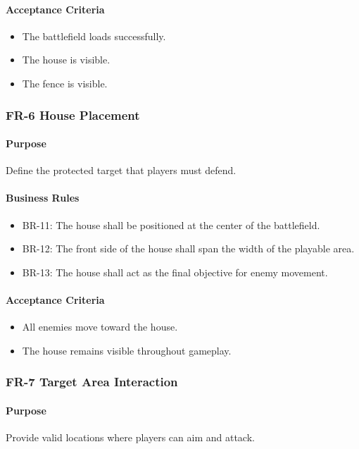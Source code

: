 \documentclass[11pt,a4paper]{article}
\begin{document}
\paragraph{Acceptance Criteria}
\begin{itemize}
  \item The battlefield loads successfully.
  \item The house is visible.
  \item The fence is visible.
\end{itemize}

\subsubsection{FR-6 House Placement}

\paragraph{Purpose}
Define the protected target that players must defend.

\paragraph{Business Rules}
\begin{itemize}
  \item BR-11: The house shall be positioned at the center of the battlefield.
  \item BR-12: The front side of the house shall span the width of the playable
        area.
  \item BR-13: The house shall act as the final objective for enemy movement.
\end{itemize}

\paragraph{Acceptance Criteria}
\begin{itemize}
  \item All enemies move toward the house.
  \item The house remains visible throughout gameplay.
\end{itemize}

\subsubsection{FR-7 Target Area Interaction}

\paragraph{Purpose}
Provide valid locations where players can aim and attack.
\end{document}
